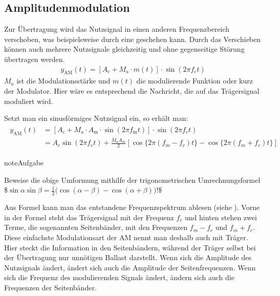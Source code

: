 \documentclass[letterpaper,10pt,english]{jupyterBook}
\begin{document}
\subsection{Amplitudenmodulation}
\label{\detokenize{content/3_Modulationen:amplitudenmodulation}}
\sphinxAtStartPar
Zur Übertragung wird das Nutzsignal in einen anderen Frequenzbereich verschoben, was beispielsweise durch eine  geschehen kann. Durch das Verschieben können auch mehrere Nutzsignale gleichzeitig und ohne gegenseitige Störung übertragen werden.
\begin{equation*}
\begin{split}y_\mathrm{AM}(t) = \left[A_c + M_a \cdot m(t)\right] \cdot \sin(2\pi  f_c  t)\end{split}
\end{equation*}
\sphinxAtStartPar
\(M_a\) ist die Modulationsstärke und \(m(t)\) die modulierende Funktion oder kurz der Modulator. Hier wäre es entsprechend die Nachricht, die auf das Trägersignal moduliert wird.

\sphinxAtStartPar
Setzt man ein sinusförmiges Nutzsignal ein, so erhält man:
\begin{equation*}
\begin{split}
\begin{align} 
y_\mathrm{AM}(t) & = \left[A_c + M_a \cdot A_\mathrm{m} \cdot \sin(2\pi f_\mathrm{m} t)\right] \cdot \sin(2\pi  f_c  t) \\
& = A_c \sin(2\pi  f_c  t)  + \frac{M_a A_m}{2} \left[ \cos\{2\pi(f_m-f_c)t \} - \cos\{2\pi(f_m+f_c)t \} \right]
\end{align} 
\end{split}
\end{equation*}
\begin{sphinxadmonition}{note}{Aufgabe}

\sphinxAtStartPar
Beweise die obige Umformung mithilfe der trigonometrischen Umrechnungsformel
\$\(\sin \alpha \sin \beta ={\frac {1}{2}}{\bigl (}\cos(\alpha -\beta )-\cos(\alpha +\beta ){\bigr )} !\)\$
\end{sphinxadmonition}

\sphinxAtStartPar
Aus Formel kann man das entstandene Frequenzspektrum ablesen (siehe {\hyperref[\detokenize{content/3_FourierAnalyse::doc}]{}}). Vorne in der Formel steht das Trägersignal mit der Frequenz \(f_c\) und hinten stehen zwei Terme, die sogenannten Seitenbänder, mit den Frequenzen \(f_m-f_c\) und \(f_m + f_c\). Diese einfachste Modulationsart der AM nennt man deshalb auch  mit Träger. Hier steckt die Information in den Seitenbändern, während der Träger selbst bei der Übertragung nur unnötigen Ballast darstellt. Wenn sich die Amplitude des Nutzsignals ändert, ändert sich auch die Amplitude der Seitenfrequenzen. Wenn sich die Frequenz des modulierenden Signals ändert, ändern sich auch die Frequenzen der Seitenbänder.
\end{document}

